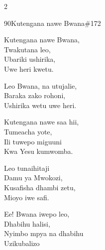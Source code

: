 \begin{multicols}{2}
\begin{hymn}{90}{Kutengana nawe Bwana}{\#172}
\begin{stanza}
Kutengana nawe Bwana,\\
Twakutana leo,\\
Ubariki ushirika,\\
Uwe heri kwetu.
\end{stanza}
\begin{chorus}
Leo Bwana, na utujalie,\\
Baraka zako rohoni,\\
Ushirika wetu uwe heri.
\end{chorus}
\begin{stanza}
Kutengana nawe saa hii,\\
Tumeacha yote,\\
Ili tuwepo miguuni\\
Kwa Yesu kumwomba.
\end{stanza}
\begin{stanza}
Leo tunaihitaji\\
Damu ya Mwokozi,\\
Kusafisha dhambi zetu,\\
Mioyo iwe safi.
\end{stanza}
\begin{stanza}
Ee! Bwana iwepo leo,\\
Dhabihu halisi,\\
Nyimbo mpya na dhabihu\\
Uzikubalizo
\end{stanza}
\end{hymn}


\end{multicols}
